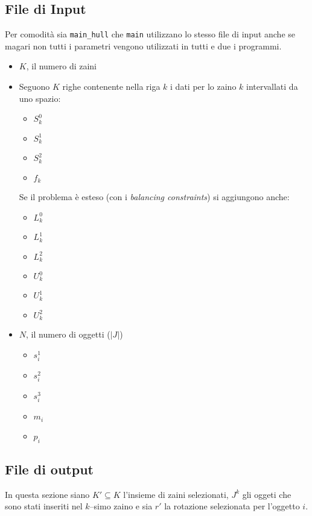 \documentclass{scrartcl}
\begin{document}
\subsection{File di Input}
Per comodità sia \verb|main_hull| che \verb|main| utilizzano lo stesso file di input anche se magari non tutti i parametri vengono utilizzati in tutti e due i programmi.
\begin{itemize}
	\item $K$, il numero di zaini
	\item Seguono $K$ righe contenente nella riga $k$ i dati per lo zaino $k$ intervallati da uno spazio:
	\begin{itemize}
		\item $S_k^0$
		\item $S_k^1$
		\item $S_k^2$
		\item $f_k$
	\end{itemize} 
	Se il problema è esteso (con i \emph{balancing constraints}) si aggiungono anche:
	\begin{itemize}
		\item $L_k^0$
		\item $L_k^1$
		\item $L_k^2$
		\item $U_k^0$
		\item $U_k^1$
		\item $U_k^2$
	\end{itemize}
	\item $N$, il numero di oggetti ($|J|$)
	\begin{itemize}
		\item $s_i^1$
		\item $s_i^2$
		\item $s_i^3$
		\item $m_i$
		\item $p_i$
	\end{itemize}
\end{itemize}

\subsection{File di output}
In questa sezione siano $K' \subseteq K$ l'insieme di zaini selezionati, 
$J^k$ gli oggeti che sono stati inseriti nel $k$--simo zaino e sia $r'$ la rotazione selezionata per l'oggetto $i$.
\end{document}
